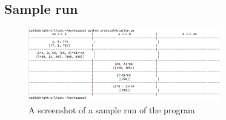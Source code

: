 \documentclass{article}
\begin{document}
\subsection{Sample run}
\begin{figure}[ht]
    \centering
    \includegraphics[width=0.75\textwidth]{sampleRun.png}
    \caption{A screenshot of a sample run of the program}
    \label{fig:sampleRun}
\end{figure}
\end{document}
